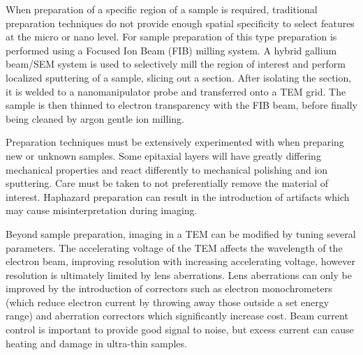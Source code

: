 When preparation of a specific region of a sample is required, traditional preparation techniques do not provide enough spatial specificity to select features at the micro or nano level.
For sample preparation of this type preparation is performed using a Focused Ion Beam (FIB) milling system.
A hybrid gallium beam/SEM system is used to selectively mill the region of interest and perform localized sputtering of a sample, slicing out a section.
After isolating the section, it is welded to a nanomanipulator probe and transferred onto a TEM grid.
The sample is then thinned to electron transparency with the FIB beam, before finally being cleaned by argon gentle ion milling.

Preparation techniques must be extensively experimented with when preparing new or unknown samples.
Some epitaxial layers will have greatly differing mechanical properties and react differently to mechanical polishing and ion sputtering.
Care must be taken to not preferentially remove the material of interest.
Haphazard preparation can result in the introduction of artifacts which may cause misinterpretation during imaging.

Beyond sample preparation, imaging in a TEM can be modified by tuning several parameters.
The accelerating voltage of the TEM affects the wavelength of the electron beam, improving resolution with increasing accelerating voltage\cite{Kohl2008}, however resolution is ultimately limited by lens aberrations.
Lens aberrations can only be improved by the introduction of correctors such as electron monochrometers (which reduce electron current by throwing away those outside a set energy range) and aberration correctors which significantly increase cost.
Beam current control is important to provide good signal to noise, but excess current can cause heating and damage in ultra-thin samples.

